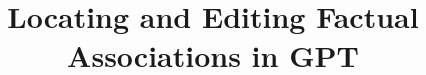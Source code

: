 \documentclass{article}
\title{Locating and Editing Factual Associations in GPT}
\begin{document}
\maketitle

\addtolength{\tabcolsep}{-5pt}












\newpage




\newpage

\appendix

\begin{appendices}



\end{appendices}

\addtolength{\tabcolsep}{5pt}
\end{document}
